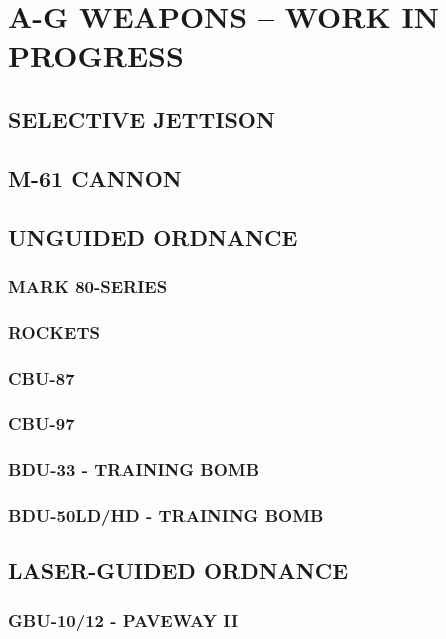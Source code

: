 \chapter{A-G WEAPONS -- WORK IN PROGRESS}
\minitoc
\cleardoublepage

\section{SELECTIVE JETTISON}

\clearpage

\section{M-61 CANNON}

\clearpage 

\section{UNGUIDED ORDNANCE}

\subsection{MARK 80-SERIES}
\subsection{ROCKETS}
\subsection{CBU-87}
\subsection{CBU-97}
\subsection{BDU-33 - TRAINING BOMB}
\subsection{BDU-50LD/HD - TRAINING BOMB}

\clearpage 

\section{LASER-GUIDED ORDNANCE}

\subsection{GBU-10/12 - PAVEWAY II}
